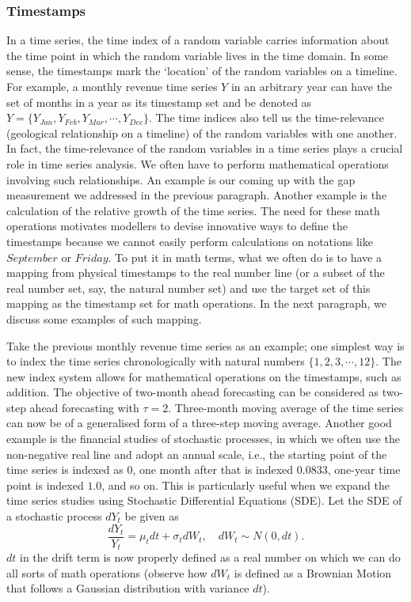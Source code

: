 \subsubsection{Timestamps}
In a time series, the time index of a random variable carries information about the time point in which the random variable lives in the time domain. In some sense, the timestamps mark the `location' of the random variables on a timeline. For example, a monthly revenue time series $Y$ in an arbitrary year can have the set of months in a year as its timestamp set and be denoted as $Y = \{ Y_{Jan}, Y_{Feb}, Y_{Mar}, \cdots, Y_{Dec} \}$. The time indices also tell us the time-relevance (geological relationship on a timeline) of the random variables with one another. In fact, the time-relevance of the random variables in a time series plays a crucial role in time series analysis. We often have to perform mathematical operations involving such relationships. An example is our coming up with the gap measurement we addressed in the previous paragraph. Another example is the calculation of the relative growth of the time series. The need for these math operations motivates modellers to devise innovative ways to define the timestamps because we cannot easily perform calculations on notations like $September$ or $Friday$. To put it in math terms, what we often do is to have a mapping from physical timestamps to the real number line (or a subset of the real number set, say, the natural number set) and use the target set of this mapping as the timestamp set for math operations. In the next paragraph, we discuss some examples of such mapping.

Take the previous monthly revenue time series as an example; one simplest way is to index the time series chronologically with natural numbers $\{ 1, 2, 3, \cdots, 12 \}$. The new index system allows for mathematical operations on the timestamps, such as addition. The objective of two-month ahead forecasting can be considered as two-step ahead forecasting with $\tau = 2$. Three-month moving average of the time series can now be of a generalised form of a three-step moving average. Another good example is the financial studies of stochastic processes, in which we often use the non-negative real line and adopt an annual scale, i.e., the starting point of the time series is indexed as $0$, one month after that is indexed $0.0833$, one-year time point is indexed $1.0$, and so on. This is particularly useful when we expand the time series studies using Stochastic Differential Equations (SDE). Let the SDE of a stochastic process $dY_t$ be given as
\begin{equation*}
    \frac{dY_t}{Y_t} = \mu_t dt + \sigma_t dW_t, \quad dW_t \sim N(0, dt).
\end{equation*}
$dt$ in the drift term is now properly defined as a real number on which we can do all sorts of math operations (observe how $dW_t$ is defined as a Brownian Motion that follows a Gaussian distribution with variance $dt$).

